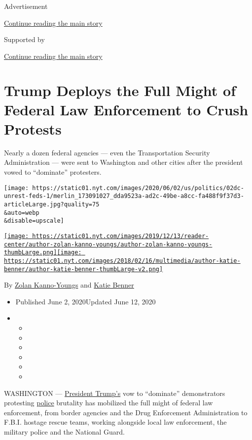 Advertisement

\protect\hyperlink{after-top}{Continue reading the main story}

Supported by

\protect\hyperlink{after-sponsor}{Continue reading the main story}

\hypertarget{trump-deploys-the-full-might-of-federal-law-enforcement-to-crush-protests}{%
\section{Trump Deploys the Full Might of Federal Law Enforcement to
Crush
Protests}\label{trump-deploys-the-full-might-of-federal-law-enforcement-to-crush-protests}}

Nearly a dozen federal agencies --- even the Transportation Security
Administration --- were sent to Washington and other cities after the
president vowed to ``dominate'' protesters.

\texttt{[image: https://static01.nyt.com/images/2020/06/02/us/politics/02dc-unrest-feds-1/merlin\_173091027\_dda9523a-ad2c-49be-a8cc-fa488f9f37d3-articleLarge.jpg?quality=75\\\&auto=webp\\\&disable=upscale]}

\href{https://www.nytimes.com/by/zolan-kanno-youngs}{\texttt{[image: https://static01.nyt.com/images/2019/12/13/reader-center/author-zolan-kanno-youngs/author-zolan-kanno-youngs-thumbLarge.png]}}\href{https://www.nytimes.com/by/katie-benner}{\texttt{[image: https://static01.nyt.com/images/2018/02/16/multimedia/author-katie-benner/author-katie-benner-thumbLarge-v2.png]}}

By \href{https://www.nytimes.com/by/zolan-kanno-youngs}{Zolan
Kanno-Youngs} and \href{https://www.nytimes.com/by/katie-benner}{Katie
Benner}

\begin{itemize}
\item
  Published June 2, 2020Updated June 12, 2020
\item
  \begin{itemize}
  \item
  \item
  \item
  \item
  \item
  \item
  \end{itemize}
\end{itemize}

WASHINGTON ---
\href{https://www.nytimes.com/2020/06/12/us/politics/trump-police-chokeholds.html}{President
Trump's} vow to ``dominate'' demonstrators protesting
\href{https://www.nytimes.com/2020/06/12/us/politics/trump-police-chokeholds.html}{police}
brutality has mobilized the full might of federal law enforcement, from
border agencies and the Drug Enforcement Administration to F.B.I.
hostage rescue teams, working alongside local law enforcement, the
military police and the National Guard.

